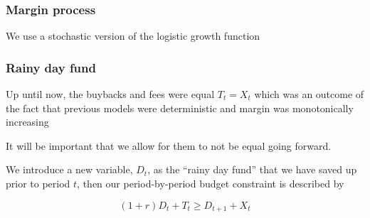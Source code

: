 \documentclass[10pt]{beamer}
\begin{document}
  \begin{frame} \frametitle{Margin process}

    We use a stochastic version of the logistic growth function

    \begin{figure}
    \end{figure}

  \end{frame}

  \begin{frame} \frametitle{Rainy day fund}

    Up until now, the buybacks and fees were equal $T_t = X_t$ which was an outcome of the
    fact that previous models were deterministic and margin was monotonically increasing

    \vspace{0.25cm}

    It will be important that we allow for them to not be equal going forward.

    \vspace{0.25cm}

    We introduce a new variable, $D_t$, as the ``rainy day fund'' that we have saved up prior to
    period $t$, then our period-by-period budget constraint is described by

    $$(1 + r) D_t + T_t \geq D_{t+1} + X_t$$

  \end{frame}
\end{document}
